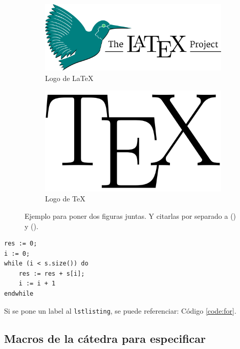 \documentclass[10pt,a4paper]{article}
\begin{document}
\begin{figure}[ht!]
	\begin{subfigure}{0.5\textwidth}
		\includegraphics[width=0.9\linewidth]{LaTeX-project} 
		\caption{Logo de LaTeX}
		\label{fig:subfig1}
	\end{subfigure}
	\begin{subfigure}{0.5\textwidth}
		\includegraphics[width=0.7\linewidth]{TeX}
		\caption{Logo de TeX}
		\label{fig:subfig2}
	\end{subfigure}
	\caption{Ejemplo para poner dos figuras juntas. Y citarlas por separado a () y ().}
	\label{fig:subfigs}
\end{figure}



	\begin{lstlisting}[caption={Ejemplo de código (usando los estilos de la cátedra, ver las macros para más detalles)},label=code:for]
res := 0;
i := 0;
while (i < s.size()) do
	res := res + s[i];
	i := i + 1
endwhile
	\end{lstlisting}

Si se pone un label al \verb|lstlisting|, se puede referenciar: Código \ref{code:for}.


\subsection{Macros de la cátedra para especificar}
\end{document}

